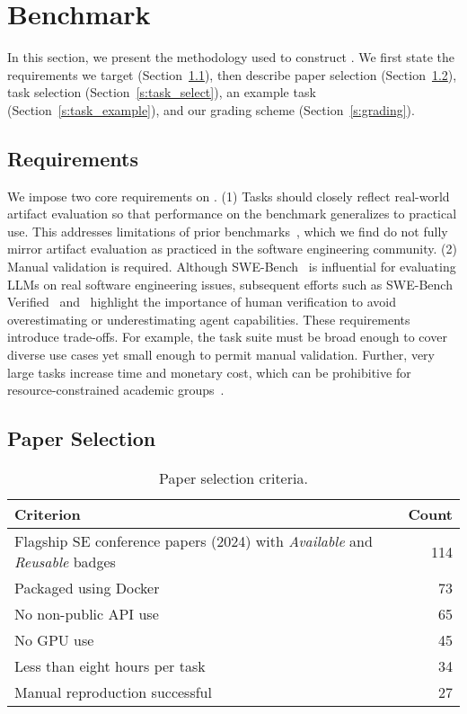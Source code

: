 \section{Benchmark}
\label{s:benchmark}

In this section, we present the methodology used to construct \benchmark.
We first state the requirements we target (Section~\ref{s:requirements}), then describe paper selection (Section~\ref{s:paper_select}), task selection (Section~\ref{s:task_select}), an example task (Section~\ref{s:task_example}), and our grading scheme (Section~\ref{s:grading}).

\subsection{Requirements}
\label{s:requirements}

We impose two core requirements on \benchmark.
(1) Tasks should closely reflect real-world artifact evaluation so that performance on the benchmark generalizes to practical use.
This addresses limitations of prior benchmarks~\cite{DBLP:conf/emnlp/BoginYG0BCSK24,DBLP:journals/tmlr/SiegelKNSN24,DBLP:conf/acl/HuZLWPK25}, which we find do not fully mirror artifact evaluation as practiced in the software engineering community.
(2) Manual validation is required.
Although SWE-Bench~\cite{jimenez2024swebench} is influential for evaluating LLMs on real software engineering issues, subsequent efforts such as SWE-Bench Verified~\cite{chowdhury2024swebenchverified} and~\cite{DBLP:journals/corr/abs-2503-15223} highlight the importance of human verification to avoid overestimating or underestimating agent capabilities.
These requirements introduce trade-offs.
For example, the task suite must be broad enough to cover diverse use cases yet small enough to permit manual validation.
Further, very large tasks increase time and monetary cost, which can be prohibitive for resource-constrained academic groups~\cite{DBLP:conf/iclr/ChanCJASMSLMPMW25}.

\subsection{Paper Selection}
\label{s:paper_select}

\begin{table}[t]
  \caption{Paper selection criteria.}
  \label{t:paper_select}
  \centering
  \begin{tabular}{@{}l r@{}}
    \toprule
    Criterion & Count \\
    \midrule
    Flagship SE conference papers (2024) with \emph{Available} and \emph{Reusable} badges & 114 \\
    Packaged using Docker & 73 \\
    No non-public API use & 65 \\
    No GPU use & 45 \\
    Less than eight hours per task & 34 \\
    Manual reproduction successful & 27 \\
    \bottomrule
  \end{tabular}
\end{table}

